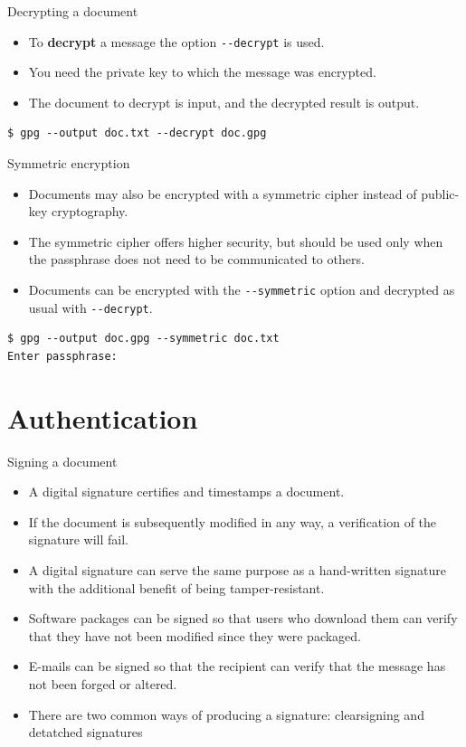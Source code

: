 \documentclass[%
mode=present,%
paper=smartboard,
size=20pt,
]{powerdot}
\newcommand{\clopt}[1]{\texttt{{-}#1}}
\begin{document}
\begin{slide}[method=direct]{Decrypting a document}
  \begin{itemize}
  \item To \textbf{decrypt} a message the option \clopt{-decrypt} is used.
  \item You need the private key to which the message was encrypted.
  \item The document to decrypt is input, and the decrypted result is
    output.
  \end{itemize}
\begin{verbatim}
$ gpg --output doc.txt --decrypt doc.gpg
\end{verbatim}
\end{slide}

\begin{slide}[method=direct]{Symmetric encryption}
  \begin{itemize}
  \item Documents may also be encrypted with a symmetric cipher
    instead of public-key cryptography.
  \item The symmetric cipher offers higher security, but should be
    used only when the passphrase does not need to be communicated to
    others.
  \item Documents can be encrypted with the \clopt{-symmetric} option
    and decrypted as usual with \clopt{-decrypt}.
  \end{itemize}
\begin{verbatim}
$ gpg --output doc.gpg --symmetric doc.txt
Enter passphrase:
\end{verbatim}
\end{slide}

\section{Authentication}

\begin{slide}{Signing a document}
  \begin{itemize}
  \item A digital signature certifies and timestamps a document.
  \item If the document is subsequently modified in any way, a
    verification of the signature will fail.
  \item A digital signature can serve the same purpose as a
    hand-written signature with the additional benefit of being
    tamper-resistant.
  \item Software packages can be signed so that users who download
    them can verify that they have not been modified since they were
    packaged.
  \item E-mails can be signed so that the recipient can verify that the
    message has not been forged or altered.
  \item There are two common ways of producing a signature:
    clearsigning and detatched signatures
  \end{itemize}
\end{slide}
\end{document}
